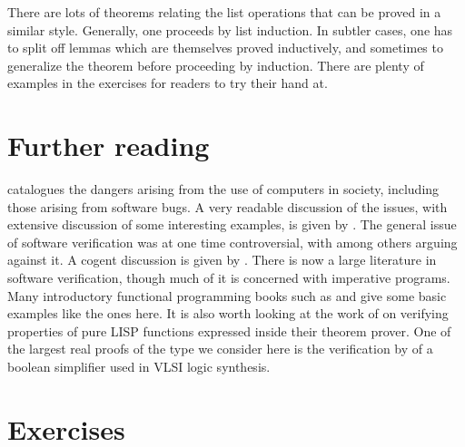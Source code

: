 There are lots of theorems relating the list operations that can be proved in a
similar style. Generally, one proceeds by list induction. In subtler cases, one
has to split off lemmas which are themselves proved inductively, and sometimes
to generalize the theorem before proceeding by induction. There are plenty of
examples in the exercises for readers to try their hand at.

\section*{Further reading}

 catalogues the dangers arising from the use of computers
in society, including those arising from software bugs. A very readable
discussion of the issues, with extensive discussion of some interesting
examples, is given by . The general issue of software
verification was at one time controversial, with  among
others arguing against it. A cogent discussion is given by
. There is now a large literature in software
verification, though much of it is concerned with imperative programs. Many
introductory functional programming books such as  and
 give some basic examples like the ones here. It is also worth
looking at the work of  on verifying properties of pure LISP
functions expressed inside their theorem prover. One of the largest real proofs
of the type we consider here is the verification by  of a
boolean simplifier used in VLSI logic synthesis.

\section*{Exercises}

